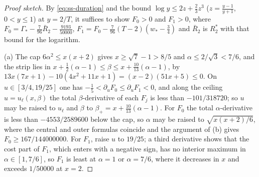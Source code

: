 \begin{proof}[Proof sketch]
By \eqref{eq:ss-duration} and the bound $\log y\le2z+\frac23z^3$ ($z=\frac{y-1}{y+1}$, $0<y\le1$)
at $y=2/T$, it suffices to show $F_0>0$ and $F_1>0$, where
$F_0=\Gamma_*-\frac7{96}\bar R_2-\frac{9193}{50000}$, $F_1=F_0-\frac7{96}(T-2)(w_*-\frac34)$ and
$\bar R_2$ is $R^*_2$ with that bound for the logarithm.

(a) The cap $6\alpha^2\le x(x+2)$ gives $x\ge\sqrt7-1>8/5$ and $\alpha\le2/\sqrt3<7/6$, and the strip
lies in $x+\frac12(\alpha-1)\le\beta\le x+\frac{10}{13}(\alpha-1)$, by
$13x(7x+1)-10(4x^2+11x+1)=(x-2)(51x+5)\le0$. On $u\in[3/4,19/25]$ one has
$-\frac15<\partial_uF_0\le\partial_uF_1<0$, and along the ceiling $u=u_\ell(x,\beta)$ the total
$\beta$-derivative of each $F_j$ is less than $-101/318720$; so $u$ may be raised to $u_\ell$ and
$\beta$ to $\beta_+=x+\frac{10}{13}(\alpha-1)$. For $F_0$ the total $\alpha$-derivative is less
than $-4553/2589600$ below the cap, so $\alpha$ may be raised to $\sqrt{x(x+2)/6}$, where the
central and outer formulas coincide and the argument of (b) gives $F_0\ge167/144000000$. For
$F_1$, raise $u$ to $19/25$; a third derivative shows that the cost part of $F_1$, which enters
with a negative sign, has no interior maximum in $\alpha\in[1,7/6]$, so $F_1$ is least at
$\alpha=1$ or $\alpha=7/6$, where it decreases in $x$ and exceeds $1/50000$ at $x=2$.


\end{proof}
